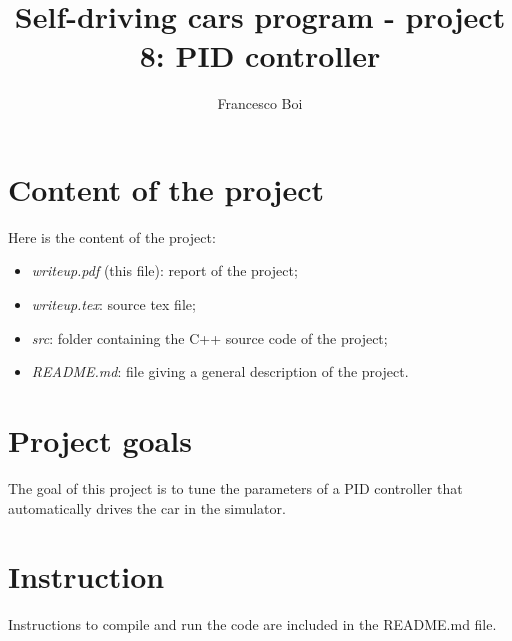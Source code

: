 \documentclass{article}
\author{Francesco Boi}
\title{Self-driving cars program - project  8: PID controller}
\date{}
\begin{document}

\maketitle
\tableofcontents 

\lstset{escapechar=ç,style=customc}
\section{Content of the project}
Here is the content of the project:
\begin{itemize}
\item \textit{writeup.pdf} (this file): report of the project;
\item \textit{writeup.tex}: source tex file;
\item \textit{src}: folder containing the C++ source code of the project;
\item \textit{README.md}: file giving a general description of the project.
\end{itemize}

\section{Project goals}
The goal of this project is to tune the parameters of a PID controller that automatically drives the car in the simulator.

\section{Instruction}
Instructions to compile and run the code are included in the README.md file.
\end{document}
